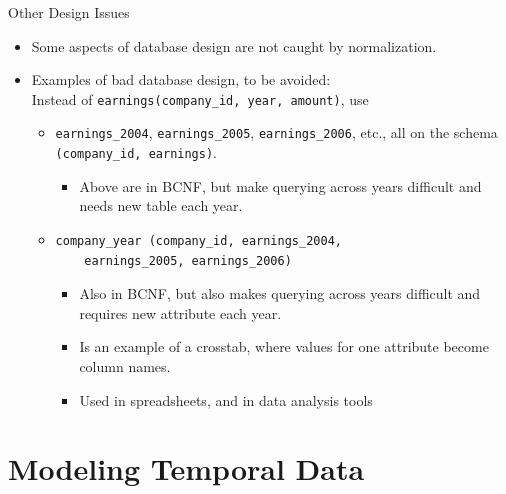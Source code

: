 \documentclass{beamer}
\begin{document}
\begin{frame}[fragile]{Other Design Issues}
    \begin{itemize}
        \item Some aspects of database design are not caught by normalization.
        \item Examples of bad database design, to be avoided:\\
            Instead of \verb|earnings(company_id, year, amount)|, use
            \begin{itemize}
                \item \verb|earnings_2004|, \verb|earnings_2005|, \verb|earnings_2006|, etc., all on the schema \verb|(company_id, earnings)|.
                    \begin{itemize}
                        \item Above are in BCNF, but make querying across years difficult and needs new table each year.
                    \end{itemize}
                \item
                    \begin{verbatim}
company_year (company_id, earnings_2004,
    earnings_2005, earnings_2006)
                    \end{verbatim}
                    \vspace{-3mm}

                    \begin{itemize}
                        \item Also in BCNF, but also makes querying across years difficult and requires new attribute each year.
                        \item Is an example of a crosstab, where values for one attribute become column names.
                        \item Used in spreadsheets, and in data analysis tools
                    \end{itemize}
            \end{itemize}
    \end{itemize}
\end{frame}

\section{Modeling Temporal Data}
\end{document}
